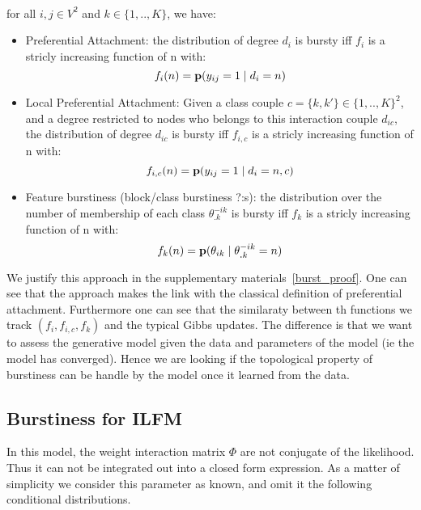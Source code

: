 \begin{proposition}~\\
for all $i,j \in V^2$ and $k \in \{1,.., K\}$, we have:
\begin{itemize}
	\item Preferential Attachment: the distribution of degree $d_i$ is bursty iff $f_i$ is a stricly increasing function of n with: $$f_i(n)=\mathbf{p}(y_{ij}=1 \mid d_i=n)$$
	\item Local Preferential Attachment: Given a class couple $c= \{k, k'\} \in \{1,..,K\}^2$, and a degree restricted to nodes who belongs to this interaction couple $d_{ic}$, the distribution of degree $d_{ic}$ is bursty iff $f_{i,c}$ is a stricly increasing function of n with: $$f_{i,c}(n)=\mathbf{p}(y_{ij}=1 \mid d_i=n, c)$$
	\item Feature burstiness (block/class burstiness ?:s): the distribution over the number of membership of each class $\theta_{\bm{.}k}^{-ik}$ is bursty iff  $f_k$  is a stricly increasing function of n with: $$f_k(n) = \mathbf{p}(\theta_{ik} \mid \theta_{\bm{.}k}^{-ik}=n)$$ 
\end{itemize}
\end{proposition}

We justify this approach in the supplementary materials~\ref{burst_proof}. One can see that the approach makes the link with the classical definition of preferential attachment. Furthermore one can see that the similaraty between th functions we track $(f_i, f_{i,c}, f_k)$ and the typical Gibbs updates. The difference is that we want to assess the generative model given the data and parameters of the model (ie the model has converged). Hence we are looking if the topological property of burstiness can be handle by the model once it learned from the data.~\\



\subsection{Burstiness for ILFM}

In this model, the weight interaction matrix $\Phi$ are not conjugate of the likelihood. Thus it can not be integrated out into a closed form expression. As a matter of simplicity we consider this parameter as known, and omit it the following conditional distributions.

